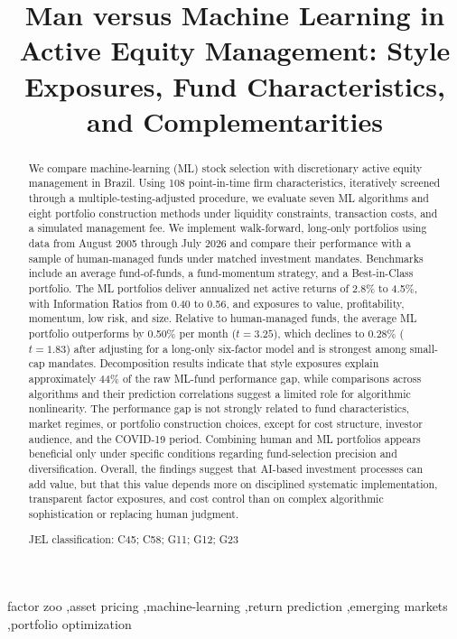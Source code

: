 \documentclass[preprint,12pt,authoryear]{elsarticle}
\begin{document}
\begin{frontmatter}

\title{Man versus Machine Learning in Active Equity Management: Style Exposures, Fund Characteristics, and Complementarities}


\begin{abstract}
	We compare machine-learning (ML) stock selection with discretionary active equity management in Brazil. Using 108 point-in-time firm characteristics, iteratively screened through a multiple-testing-adjusted procedure, we evaluate seven ML algorithms and eight portfolio construction methods under liquidity constraints, transaction costs, and a simulated management fee. We implement walk-forward, long-only portfolios using data from August 2005 through July 2026 and compare their performance with a sample of human-managed funds under matched investment mandates. Benchmarks include an average fund-of-funds, a fund-momentum strategy, and a Best-in-Class portfolio. The ML portfolios deliver annualized net active returns of 2.8\% to 4.5\%, with Information Ratios  from 0.40 to 0.56, and exposures to value, profitability, momentum, low risk, and size. Relative to human-managed funds, the average ML portfolio outperforms by 0.50\%  per month ($t=3.25$), which declines to 0.28\% ($t=1.83$) after adjusting for a long-only six-factor model and is strongest among small-cap mandates. Decomposition results indicate that style exposures explain approximately 44\% of the raw ML-fund performance gap, while comparisons across algorithms and their prediction correlations suggest a limited role for algorithmic nonlinearity. The performance gap is not strongly related to fund characteristics, market regimes, or portfolio construction choices, except for cost structure, investor audience, and the COVID-19 period. Combining human and ML portfolios appears beneficial only under specific conditions regarding fund-selection precision and diversification. Overall, the findings suggest that AI-based investment processes can add value, but that this value depends more on disciplined systematic implementation, transparent factor exposures, and cost control than on complex algorithmic sophistication or replacing human judgment.
		
	\vspace{0.5em}
	
JEL classification: C45; C58; G11; G12; G23


\vspace{0.5em}
\noindent


\end{abstract}


\begin{keyword}
factor zoo \sep asset pricing \sep machine-learning \sep return prediction \sep emerging markets \sep portfolio optimization 




\end{keyword}

\end{frontmatter}
\end{document}
